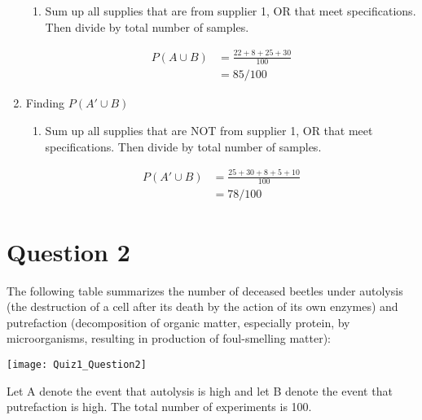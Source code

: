 \documentclass[../INDE315_HW.tex]{subfiles}
\begin{document}
\begin{enumerate}
\begin{enumerate}
            \item Sum up all supplies that are from supplier 1, OR that meet specifications. Then divide by total number of samples.
        \end{enumerate}
        \begin{equation*}
            \begin{aligned}
                P(A \cup B) &= \frac{22 + 8 + 25 + 30}{100} \\
                        &= 85/100
            \end{aligned}
        \end{equation*}
    \item Finding $P(A' \cup B)$
        \begin{enumerate}
            \item Sum up all supplies that are NOT from supplier 1, OR that meet specifications. Then divide by total number of samples.
        \end{enumerate}
        \begin{equation*}
            \begin{aligned}
                P(A' \cup B) &= \frac{25 + 30 + 8 + 5 + 10}{100} \\
                        &= 78/100
            \end{aligned}
        \end{equation*}
\end{enumerate}

\section*{Question 2}
The following table summarizes the number of deceased beetles under autolysis (the destruction of a cell after its death by the action of its own enzymes) and putrefaction (decomposition of organic matter, especially protein, by microorganisms, resulting in production of foul-smelling matter):
\begin{center}
    \texttt{[image: Quiz1\_Question2]}
\end{center}
Let A denote the event that autolysis is high and let B denote the event that putrefaction is high. The total number of experiments is 100.
\end{document}
